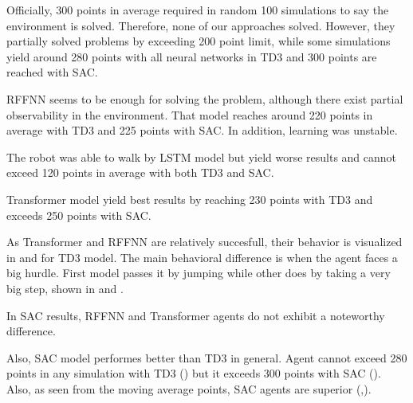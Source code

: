 Officially, 300 points in average required in random 100 simulations to say the environment is solved.
Therefore, none of our approaches solved.
However, they partially solved problems by exceeding 200 point limit, while some simulations yield around 280 points with all neural networks in TD3 and 300 points are reached with SAC. 

RFFNN seems to be enough for solving the problem, although there exist partial observability in the environment. 
That model reaches around 220 points in average with TD3 and 225 points with SAC. In addition, learning was unstable. 

The robot was able to walk by LSTM model but yield worse results and cannot exceed 120 points in average with both TD3 and SAC. 

Transformer model yield best results by reaching 230 points with TD3 and exceeds 250 points with SAC. 

As Transformer and RFFNN are relatively succesfull, their behavior is visualized in  and  for TD3 model. 
The main behavioral difference is when the agent faces a big hurdle. 
First model passes it by jumping while other does by taking a very big step, shown in  and .

In SAC results, RFFNN and Transformer agents do not exhibit a noteworthy difference.

Also, SAC model performes better than TD3 in general. 
Agent cannot exceed 280 points in any simulation with TD3 () but it exceeds 300 points with SAC (). Also, as seen from the moving average points, SAC agents are superior (,).

